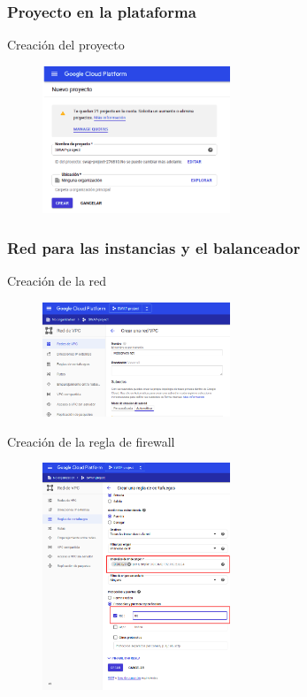 \documentclass{beamer}
\begin{document}
\subsubsection{Proyecto en la plataforma}

\begin{frame}[fragile]{Creación del proyecto}
  \begin{figure}[H]
		\centering
		\includegraphics[width=0.5\textwidth]{project/create_project.png}
	\end{figure}
\end{frame}

\subsubsection{Red para las instancias y el balanceador}

\begin{frame}[fragile]{Creación de la red}
  \begin{figure}[H]
		\centering
		\includegraphics[width=0.5\textwidth]{project/vpc_creation.png}
	\end{figure}
\end{frame}

\begin{frame}[fragile]{Creación de la regla de firewall}
  \begin{figure}[H]
		\centering
		\includegraphics[width=0.5\textwidth]{project/firewall_creation.png}
	\end{figure}
\end{frame}
\end{document}
